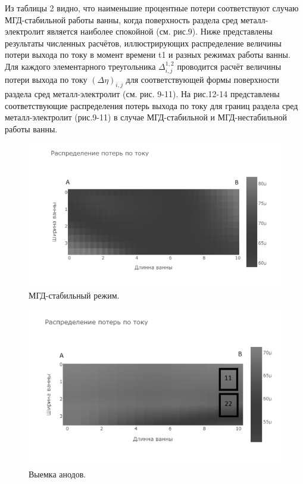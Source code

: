 \documentclass{article}
\begin{document}
Из таблицы 2 видно, что наименьшие процентные потери соответствуют случаю МГД-стабильной работы ванны, когда поверхность раздела сред металл-электролит является наиболее спокойной (см. рис.9).
Ниже представлены результаты численных расчётов, иллюстрирующих распределение величины потери выхода по току в момент времени t1 и разных режимах работы ванны. Для каждого элементарного треугольника $\Delta^{1,2}_{i,j}$ проводится расчёт величины потери выхода по току $(\Delta\eta)_{i,j}$ для соответствующей формы поверхности раздела сред металл-электролит (см. рис. 9-11). На рис.12-14 представлены соответствующие распределения потерь выхода по току для границ раздела сред металл-электролит (рис.9-11) в случае МГД-стабильной и МГД-нестабильной работы ванны. 

\begin{figure}[H]
    \centering
    \includegraphics[width=150mm]{h.png}
    \caption{МГД-стабильный режим.}
    \label{fig:} 
\end{figure}

\begin{figure}[H]
    \centering
    \includegraphics[width=150mm]{выемка анодов.png}
    \caption{Выемка анодов.}
    \label{fig:} 
\end{figure}
\end{document}
